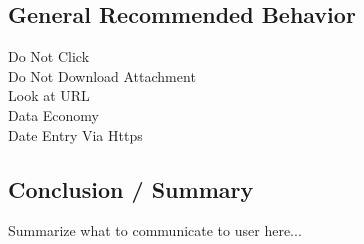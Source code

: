 \subsection{General Recommended Behavior}
\begin{description}
	\item[Do Not Click]
	\item[Do Not Download Attachment]
	\item[Look at URL]
	\item[Data Economy]
	\item[Date Entry Via Https]
\end{description}

\subsection{Conclusion / Summary}

Summarize what to communicate to user here...

